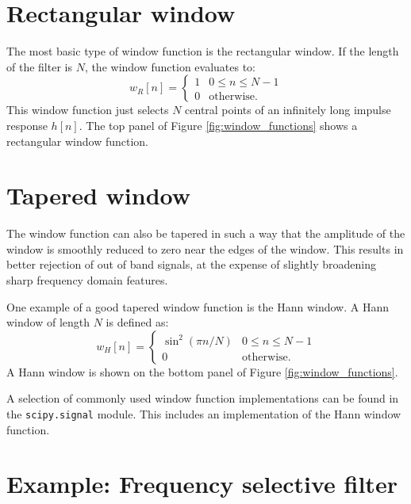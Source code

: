 \section{Rectangular window}

The most basic type of window function is the rectangular window. If
the length of the filter is $N$, the window function evaluates to:
\begin{equation}
  w_{R}[n] =\left\{ \begin{array}{cc}
    1 & 0 \le n \le N-1     \\
    0 & \mathrm{otherwise}.
  \end{array}
  \right.
\end{equation}
This window function just selects $N$ central points of an infinitely
long impulse response $h[n]$.  The top panel of Figure
\ref{fig:window_functions} shows a rectangular window function.


\section{Tapered window}

The window function can also be tapered in such a way that the
amplitude of the window is smoothly reduced to zero near the edges of
the window. This results in better rejection of out of band signals,
at the expense of slightly broadening sharp frequency domain
features.

One example of a good tapered window function is the Hann window. A
Hann window of length $N$ is defined as:
\begin{equation}
  w_{H}[n] =\left\{ \begin{array}{cc}
    \sin^2(\pi n/N) & 0 \le n \le N-1     \\
    0               & \mathrm{otherwise}.
  \end{array}
  \right.
  \label{eq:hann_window_def}
\end{equation}
A Hann window is shown on the bottom panel of Figure
\ref{fig:window_functions}.

A selection of commonly used window function implementations can be
found in the \verb|scipy.signal| module. This includes an
implementation of the Hann window function.


\section{Example: Frequency selective filter}

